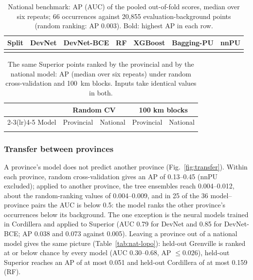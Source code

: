 \documentclass[pdflatex,sn-apa]{sn-jnl}
\begin{document}
\begin{table}[t]
\caption{National benchmark: AP (AUC) of the pooled out-of-fold scores, median over six repeats; 66 occurrences against 20,855 evaluation-background points (random ranking: AP 0.003). Bold: highest AP in each row.}\label{tab:nat-benchmark}
\scriptsize
\setlength{\tabcolsep}{2.5pt}
\begin{tabular*}{\textwidth}{@{\extracolsep\fill}lcccccc}
\toprule
Split & DevNet & DevNet-BCE & RF & XGBoost & Bagging-PU & nnPU \\
\midrule
\botrule
\end{tabular*}
\end{table}

\begin{table}[t]
\caption{The same Superior points ranked by the provincial and by the national model: AP (median over six repeats) under random cross-validation and 100~km blocks. Inputs take identical values in both.}\label{tab:nat-superior}
\footnotesize
\begin{tabular*}{0.8\textwidth}{@{\extracolsep\fill}lcccc}
\toprule
 & \multicolumn{2}{c}{Random CV} & \multicolumn{2}{c}{100 km blocks} \\
\cmidrule(lr){2-3}\cmidrule(lr){4-5}
Model & Provincial & National & Provincial & National \\
\midrule
\botrule
\end{tabular*}
\end{table}

\subsubsection{Transfer between provinces}\label{sec:res-transfer}

A province's model does not predict another province (Fig.~\ref{fig:transfer}). Within each province, random cross-validation gives an AP of 0.13--0.45 (nnPU excluded); applied to another province, the tree ensembles reach 0.004--0.012, about the random-ranking values of 0.004--0.009, and in 25 of the 36 model--province pairs the AUC is below 0.5: the model ranks the other province's occurrences below its background. The one exception is the neural models trained in Cordillera and applied to Superior (AUC 0.79 for DevNet and 0.85 for DevNet-BCE; AP 0.038 and 0.073 against 0.005). Leaving a province out of a national model gives the same picture (Table~\ref{tab:nat-lopo}): held-out Grenville is ranked at or below chance by every model (AUC 0.30--0.68, AP $\leq 0.026$), held-out Superior reaches an AP of at most 0.051 and held-out Cordillera of at most 0.159 (RF).
\end{document}
